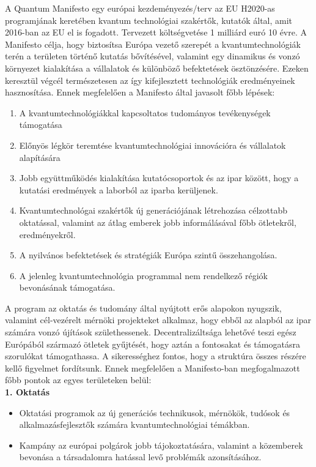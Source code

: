 A Quantum Manifesto egy európai kezdeményezés/terv az EU H2020-as programjának keretében kvantum technológiai szakértők, kutatók által, amit 2016-ban az EU el is fogadott. Tervezett költségvetése 1 milliárd euró 10 évre. A Manifesto célja, hogy biztosítsa Európa vezető szerepét a kvantumtechnológiák terén a területen történő kutatás bővítésével, valamint egy dinamikus és vonzó környezet kialakítása a vállalatok és különböző befektetések ösztönzésére. Ezeken keresztül végcél természetesen az így kifejlesztett technológiák eredményeinek hasznosítása. Ennek megfelelően a Manifesto által javasolt főbb lépések:
\begin{enumerate}
\item A kvantumtechnológiákkal kapcsoltatos tudományos tevékenységek támogatása
\item Előnyös légkör teremtése kvantumtechnológiai innovációra és vállalatok alapítására
\item Jobb együttműködés kialakítása kutatócsoportok és az ipar között, hogy a kutatási eredmények a laborból az iparba kerüljenek.
\item Kvantumtechnológai szakértők új generációjának létrehozása célzottabb oktatással, valamint az átlag emberek jobb informálásával főbb ötletekről, eredményekről.
\item A nyilvános befektetések és stratégiák Európa szintű összehangolása.
\item A jelenleg kvantumtechnológia programmal nem rendelkező régiók bevonásának támogatása.
\end{enumerate}
A program az oktatás és tudomány által nyújtott erős alapokon nyugszik, valamint cél-vezérelt mérnöki projekteket alkalmaz, hogy ebből az alapból az ipar számára vonzó újítások születhessenek. Decentralizáltsága lehetővé teszi egész Európából származó ötletek gyűjtését, hogy aztán a fontosakat  és támogatásra szorulókat támogathassa. A sikerességhez fontos, hogy a struktúra összes részére kellő figyelmet fordítsunk. Ennek megfelelően a Manifesto-ban megfogalmazott főbb pontok az egyes területeken belül:\\
\textbf{\color{blue}1. Oktatás} 
\begin{itemize}
\item Oktatási programok az új generációs technikusok, mérnökök, tudósok és alkalmazásfejlesztők számára kvantumtechnológiai témákban.
\item Kampány az európai polgárok jobb tájokoztatására, valamint a közemberek bevonása a társadalomra hatással levő problémák azonsításához.
\end{itemize}
